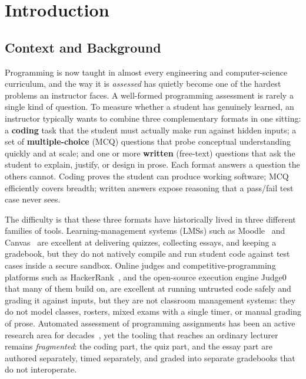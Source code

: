 \chapter{Introduction}\label{ch:ch01}

\section{Context and Background}

Programming is now taught in almost every engineering and computer-science
curriculum, and the way it is \emph{assessed} has quietly become one of the
hardest problems an instructor faces. A well-formed programming assessment is
rarely a single kind of question. To measure whether a student has genuinely
learned, an instructor typically wants to combine three complementary formats
in one sitting: a \textbf{coding} task that the student must actually make
run against hidden inputs; a set of \textbf{multiple-choice} (MCQ) questions
that probe conceptual understanding quickly and at scale; and one or more
\textbf{written} (free-text) questions that ask the student to explain,
justify, or design in prose. Each format answers a question the others cannot.
Coding proves the student can produce working software; MCQ efficiently covers
breadth; written answers expose reasoning that a pass/fail test case never
sees.

The difficulty is that these three formats have historically lived in three
different families of tools. Learning-management systems (LMSs) such as
Moodle~\cite{moodle2002} and Canvas~\cite{canvas} are excellent at delivering
quizzes, collecting essays, and keeping a gradebook, but they do not natively
compile and run student code against test cases inside a secure sandbox.
Online judges and competitive-programming platforms such as
HackerRank~\cite{hackerrank}, and the open-source execution engine
Judge0~\cite{judge0,dosilovic2018judge0} that many of them build on, are
excellent at running untrusted code safely and grading it against inputs, but
they are not classroom management systems: they do not model classes, rosters,
mixed exams with a single timer, or manual grading of prose. Automated
assessment of programming assignments has been an active research area for
decades~\cite{douce2005autoassess,ihantola2010autograding,caceres2014online,wasik2018survey},
yet the tooling that reaches an ordinary lecturer remains \emph{fragmented}:
the coding part, the quiz part, and the essay part are authored separately,
timed separately, and graded into separate gradebooks that do not
interoperate.

